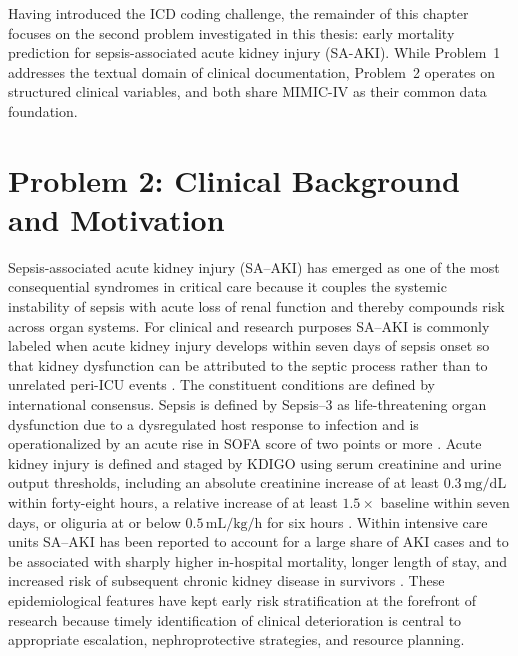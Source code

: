 \bigskip
\noindent Having introduced the ICD coding challenge, the remainder of this chapter focuses on the second problem investigated in this thesis: early mortality prediction for sepsis-associated acute kidney injury (SA-AKI). While Problem~1 addresses the textual domain of clinical documentation, Problem~2 operates on structured clinical variables, and both share MIMIC-IV as their common data foundation.

\section{Problem 2: Clinical Background and Motivation} Sepsis-associated acute kidney injury (SA--AKI) has emerged as one of the most consequential syndromes in critical care because it couples the systemic instability of sepsis with acute loss of renal function and thereby compounds risk across organ systems. For clinical and research purposes SA--AKI is commonly labeled when acute kidney injury develops within seven days of sepsis onset so that kidney dysfunction can be attributed to the septic process rather than to unrelated peri-ICU events \citep{Peerapornratana_2019}. The constituent conditions are defined by international consensus. Sepsis is defined by Sepsis--3 as life-threatening organ dysfunction due to a dysregulated host response to infection and is operationalized by an acute rise in SOFA score of two points or more \citep{Singer_2016}. Acute kidney injury is defined and staged by KDIGO using serum creatinine and urine output thresholds, including an absolute creatinine increase of at least $0.3\,\mathrm{mg/dL}$ within forty-eight hours, a relative increase of at least $1.5\times$ baseline within seven days, or oliguria at or below $0.5\,\mathrm{mL/kg/h}$ for six hours \citep{KDIGO_2012}. Within intensive care units SA--AKI has been reported to account for a large share of AKI cases and to be associated with sharply higher in-hospital mortality, longer length of stay, and increased risk of subsequent chronic kidney disease in survivors \citep{Poston_Koyner_2019,Peerapornratana_2019}. These epidemiological features have kept early risk stratification at the forefront of research because timely identification of clinical deterioration is central to appropriate escalation, nephroprotective strategies, and resource planning.

